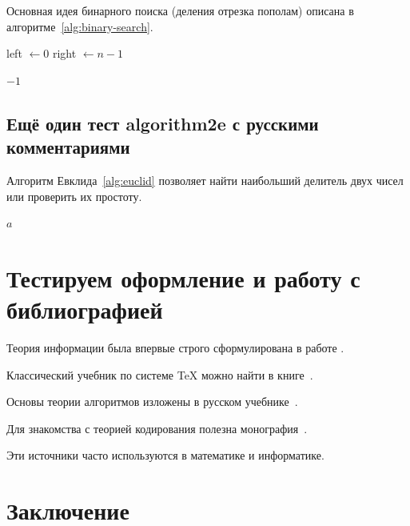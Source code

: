 \documentclass[14pt]{cmcmsuthesis-bachelor}
\begin{document}
Основная идея бинарного поиска (деления отрезка пополам) описана в алгоритме~\ref{alg:binary-search}.

\begin{algorithm}[H]

left $\gets 0$\;
right $\gets n - 1$\;


\KwRet $-1$\;
\caption{\label{alg:binary-search}Бинарный поиск}
\end{algorithm}
\subsection{Ещё один тест algorithm2e с русскими комментариями}
\label{sec:org37ca9ff}

Алгоритм Евклида~\ref{alg:euclid} позволяет найти наибольший делитель двух чисел или проверить их простоту.

\begin{algorithm}[H]

\KwRet $a$\;
\caption{\label{alg:euclid}Алгоритм Евклида}
\end{algorithm}
\section{Тестируем оформление и работу с библиографией}
\label{sec:orgd5c6cd2}

Теория информации была впервые строго сформулирована в работе
\cite{Shannon1948}.

Классический учебник по системе \TeX{} можно найти в книге~\cite{Knuth1984}.

Основы теории алгоритмов изложены в русском учебнике~\cite{aho1979}.

Для знакомства с теорией кодирования полезна монография~\cite{macwilliams1979}.

Эти источники часто используются в математике и информатике.
\section*{Заключение}
\label{sec:org08d5743}
\end{document}
